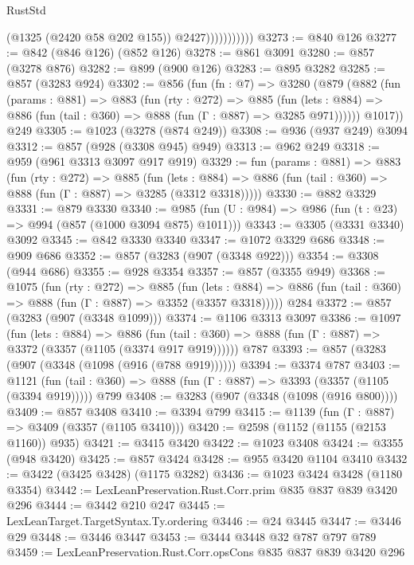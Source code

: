 \begin{lexlean}{RustStd}
\begin{coremodule}
                          (@1325 (@2420 @58 @202 @155))
                          @2427)))))))))))
@3273 := @840 @126
@3277 := @842 (@846 @126) (@852 @126)
@3278 := @861 @3091
@3280 := @857 (@3278 @876)
@3282 := @899 (@900 @126)
@3283 := @895 @3282
@3285 := @857 (@3283 @924)
@3302 := @856
    (fun (fn : @7) =>
    @3280
      (@879
        (@882
          (fun (params : @881) =>
          @883
            (fun (rty : @272) =>
            @885
              (fun (lets : @884) =>
              @886 (fun (tail : @360) => @888 (fun (Γ : @887) => @3285 @971))))))
        @1017))
    @249
@3305 := @1023 (@3278 (@874 @249))
@3308 := @936 (@937 @249) @3094
@3312 := @857 (@928 (@3308 @945) @949)
@3313 := @962 @249
@3318 := @959 (@961 @3313 @3097 @917 @919)
@3329 := fun (params : @881) =>
  @883
    (fun (rty : @272) =>
    @885
      (fun (lets : @884) =>
      @886 (fun (tail : @360) => @888 (fun (Γ : @887) => @3285 (@3312 @3318)))))
@3330 := @882 @3329
@3331 := @879 @3330
@3340 := @985 (fun (U : @984) => @986 (fun (t : @23) => @994 (@857 (@1000 @3094 @875) @1011)))
@3343 := @3305 (@3331 @3340) @3092
@3345 := @842 @3330 @3340
@3347 := @1072 @3329 @686
@3348 := @909 @686
@3352 := @857 (@3283 (@907 (@3348 @922)))
@3354 := @3308 (@944 @686)
@3355 := @928 @3354
@3357 := @857 (@3355 @949)
@3368 := @1075
    (fun (rty : @272) =>
    @885
      (fun (lets : @884) =>
      @886 (fun (tail : @360) => @888 (fun (Γ : @887) => @3352 (@3357 @3318)))))
    @284
@3372 := @857 (@3283 (@907 (@3348 @1099)))
@3374 := @1106 @3313 @3097
@3386 := @1097
    (fun (lets : @884) =>
    @886 (fun (tail : @360) => @888 (fun (Γ : @887) => @3372 (@3357 (@1105 (@3374 @917 @919))))))
    @787
@3393 := @857 (@3283 (@907 (@3348 (@1098 (@916 (@788 @919))))))
@3394 := @3374 @787
@3403 := @1121
    (fun (tail : @360) => @888 (fun (Γ : @887) => @3393 (@3357 (@1105 (@3394 @919)))))
    @799
@3408 := @3283 (@907 (@3348 (@1098 (@916 @800))))
@3409 := @857 @3408
@3410 := @3394 @799
@3415 := @1139 (fun (Γ : @887) => @3409 (@3357 (@1105 @3410)))
@3420 := @2598 (@1152 (@1155 (@2153 @1160)) @935)
@3421 := @3415 @3420
@3422 := @1023 @3408
@3424 := @3355 (@948 @3420)
@3425 := @857 @3424
@3428 := @955 @3420 @1104 @3410
@3432 := @3422 (@3425 @3428) (@1175 @3282)
@3436 := @1023 @3424 @3428 (@1180 @3354)
@3442 := LexLeanPreservation.Rust.Corr.prim @835 @837 @839 @3420 @296
@3444 := @3442 @210 @247
@3445 := LexLeanTarget.TargetSyntax.Ty.ordering
@3446 := @24 @3445
@3447 := @3446 @29
@3448 := @3446 @3447
@3453 := @3444 @3448 @32 @787 @797 @789
@3459 := LexLeanPreservation.Rust.Corr.opsCons @835 @837 @839 @3420 @296

\end{coremodule}
\end{lexlean}
